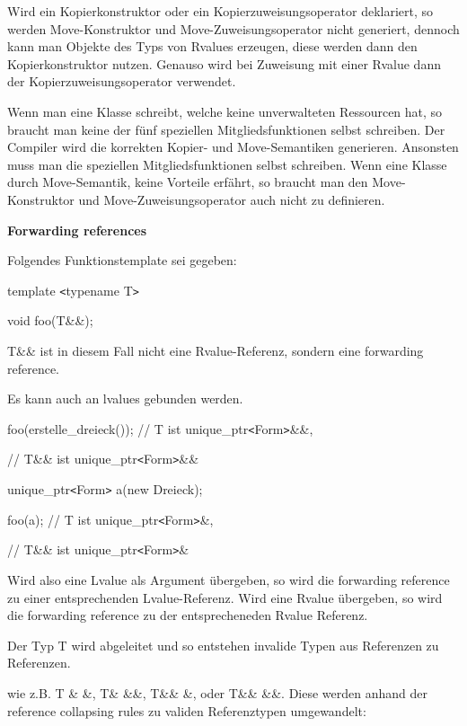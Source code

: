 \documentclass{article}
\begin{document}
\vspace{220pt}
Wird ein Kopierkonstruktor oder ein Kopierzuweisungsoperator deklariert, so werden 
Move-Konstruktor und Move-Zuweisungsoperator nicht generiert, dennoch kann man 
Objekte des Typs von Rvalues erzeugen, diese werden dann den Kopierkonstruktor 
nutzen. Genauso wird bei Zuweisung mit einer Rvalue dann der Kopierzuweisungsoperator 
verwendet.

Wenn man eine Klasse schreibt, welche keine unverwalteten Ressourcen hat, so braucht 
man keine der fünf speziellen Mitgliedsfunktionen selbst schreiben. Der Compiler 
wird die korrekten Kopier- und Move-Semantiken generieren. Ansonsten muss man die 
speziellen Mitgliedsfunktionen selbst schreiben. Wenn eine Klasse durch Move-Semantik, 
keine Vorteile erfährt, so braucht man den Move-Konstruktor und Move-Zuweisungsoperator 
auch nicht zu definieren.

\vspace{12pt}
\textbf{Forwarding references}

Folgendes Funktionstemplate sei gegeben:

template \texttt{<}typename T\texttt{>}

void foo(T\&\&);

T\&\& ist in diesem Fall nicht eine Rvalue-Referenz, sondern eine forwarding reference.

Es kann auch an lvalues gebunden werden.

foo(erstelle\_dreieck()); // T ist unique\_ptr\texttt{<}Form\texttt{>}\&\&,    
                     

\parindent=90pt
// T\&\& ist unique\_ptr\texttt{<}Form\texttt{>}\&\&

\parindent=0pt
unique\_ptr\texttt{<}Form\texttt{>} a(new Dreieck);

foo(a); // T ist unique\_ptr\texttt{<}Form\texttt{>}\&,        

\parindent=28pt
// T\&\& ist unique\_ptr\texttt{<}Form\texttt{>}\&

\parindent=0pt
Wird also eine Lvalue als Argument übergeben, so wird die forwarding reference 
zu einer entsprechenden Lvalue-Referenz. Wird eine Rvalue übergeben, so wird die 
forwarding reference zu der entsprecheneden Rvalue Referenz.

Der Typ T wird abgeleitet und so entstehen invalide Typen aus Referenzen zu Referenzen.

wie z.B. T \& \&, T\& \&\&, T\&\& \&, oder T\&\& \&\&. Diese werden anhand der 
reference collapsing rules zu validen Referenztypen umgewandelt:
\end{document}
